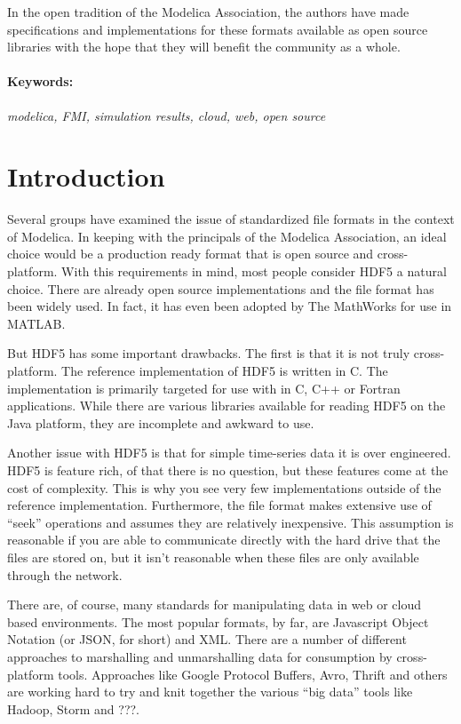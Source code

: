 \documentclass[11pt,a4paper,twocolumn]{article}
\begin{document}
In the open tradition of the Modelica Association, the authors have
made specifications and implementations for these formats available as
open source libraries with the hope that they will benefit the
community as a whole.

\paragraph{Keywords:}\emph{modelica, FMI, simulation results,
  cloud, web, open source}

\section{Introduction}
\label{sec:intro}

Several groups have examined the issue of standardized file formats
\cite{AndreasHDF5,GallHDF5} in the context of Modelica.  In keeping
with the principals of the Modelica Association, an ideal choice would
be a production ready format that is open source and cross-platform.
With this requirements in mind, most people consider HDF5 a natural
choice.  There are already open source implementations and the file
format has been widely used.  In fact, it has even been adopted by The
MathWorks for use in MATLAB.

But HDF5 has some important drawbacks.  The first is that it is not
truly cross-platform.  The reference implementation of HDF5 is written
in C.  The implementation is primarily targeted for use with in C, C++
or Fortran applications.  While there are various libraries available
for reading HDF5 on the Java platform\cite{HDFJava}, they are
incomplete and awkward to use.

Another issue with HDF5 is that for simple time-series data it is over
engineered.  HDF5 is feature rich, of that there is no question, but
these features come at the cost of complexity.  This is why you see
very few implementations outside of the reference implementation.
Furthermore, the file format makes extensive use of ``seek''
operations and assumes they are relatively inexpensive.  This
assumption is reasonable if you are able to communicate directly with
the hard drive that the files are stored on, but it isn't reasonable
when these files are only available through the network.

There are, of course, many standards for manipulating data in web or
cloud based environments.  The most popular formats, by far, are
Javascript Object Notation (or JSON, for short) and XML.  There are a
number of different approaches to marshalling and unmarshalling data
for consumption by cross-platform tools.  Approaches like Google
Protocol Buffers\cite{GPB}, Avro\cite{Avro}, Thrift\cite{Thrift} and
others are working hard to try and knit together the various ``big
data'' tools like Hadoop\cite{Hadoop}, Storm\cite{Storm} and ???.
\end{document}
